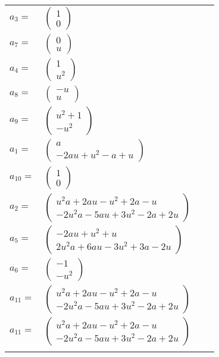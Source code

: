 \documentclass[1p]{elsarticle_modified}
\theoremstyle{definition}
\begin{document}
\begin{tabular}{m{7pt} m{180pt} m{7pt} m{180pt} }
\flushright $a_{3}=$&$\begin{pmatrix}1\\0\end{pmatrix}$ \\
\flushright $a_{7}=$&$\begin{pmatrix}0\\u\end{pmatrix}$ \\
\flushright $a_{4}=$&$\begin{pmatrix}1\\u^2\end{pmatrix}$ \\
\flushright $a_{8}=$&$\begin{pmatrix}- u\\u\end{pmatrix}$ \\
\flushright $a_{9}=$&$\begin{pmatrix}u^2+1\\- u^2\end{pmatrix}$ \\
\flushright $a_{1}=$&$\begin{pmatrix}a\\-2 a u+u^2- a+u\end{pmatrix}$ \\
\flushright $a_{10}=$&$\begin{pmatrix}1\\0\end{pmatrix}$ \\
\flushright $a_{2}=$&$\begin{pmatrix}u^2 a+2 a u- u^2+2 a- u\\-2 u^2 a-5 a u+3 u^2-2 a+2 u\end{pmatrix}$ \\
\flushright $a_{5}=$&$\begin{pmatrix}-2 a u+u^2+u\\2 u^2 a+6 a u-3 u^2+3 a-2 u\end{pmatrix}$ \\
\flushright $a_{6}=$&$\begin{pmatrix}-1\\- u^2\end{pmatrix}$ \\
\flushright $a_{11}=$&$\begin{pmatrix}u^2 a+2 a u- u^2+2 a- u\\-2 u^2 a-5 a u+3 u^2-2 a+2 u\end{pmatrix}$\\ \flushright $a_{11}=$&$\begin{pmatrix}u^2 a+2 a u- u^2+2 a- u\\-2 u^2 a-5 a u+3 u^2-2 a+2 u\end{pmatrix}$\\&\end{tabular}
\end{document}
